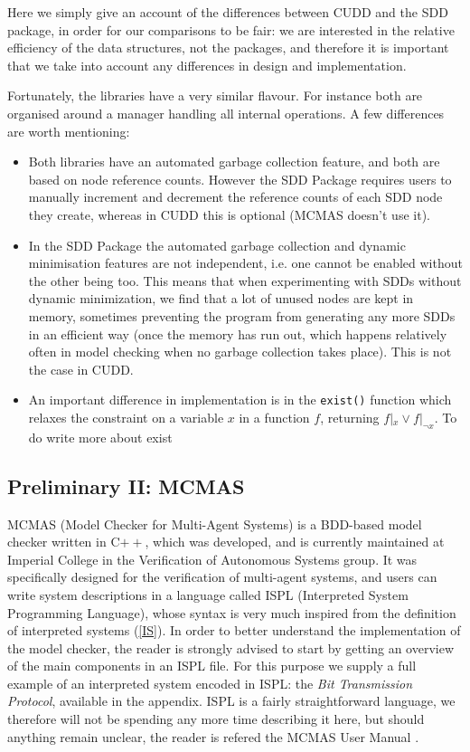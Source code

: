 \documentclass[11pt]{article}
\begin{document}
Here we simply give an account of the differences between  CUDD and the SDD package, in order for our comparisons to be fair: we are interested in the relative efficiency of the data structures, not the packages, and therefore it is important that we take into account any differences in design and implementation. 

Fortunately, the libraries have a very similar flavour. For instance both are organised around a manager handling all internal operations. A few differences are worth mentioning:
\begin{itemize}
\item Both libraries have an automated garbage collection feature, and both are based on node reference counts. However the SDD Package requires users to manually increment and decrement the reference counts of each SDD node they create, whereas in CUDD this is optional (MCMAS doesn't use it). 
\item In the SDD Package the automated garbage collection and dynamic minimisation features are not independent, i.e. one cannot be enabled without the other being too. This means that when experimenting with SDDs without dynamic minimization, we find that a lot of unused nodes are kept in memory, sometimes preventing the program from generating any more SDDs in an efficient way (once the memory has run out, which happens relatively often in model checking when no garbage collection takes place). This is not the case in CUDD. 
\item An important difference in implementation is in the \texttt{exist()} function which relaxes the constraint on a variable $x$ in a function $f$, returning $f|_x \lor f|_{\lnot x}$. 
To do write more about exist
\end{itemize}
\label{gc}

\subsection{Preliminary II: MCMAS} 


MCMAS (Model Checker for Multi-Agent Systems) is a BDD-based model checker written in C$++$, which was developed, and is currently maintained at Imperial College in the Verification of Autonomous Systems group. It was specifically designed for the verification of multi-agent systems, and users can write system descriptions in a language called ISPL (Interpreted System Programming Language), whose syntax is very much inspired from the definition of interpreted systems (\ref{IS}). In order to better understand the implementation of the model checker, the reader is strongly advised to start by getting an overview of the main components in an ISPL file. For this purpose we supply a full example of an interpreted system encoded in ISPL: the \textit{Bit Transmission Protocol}, available in the appendix. ISPL is a fairly straightforward language, we therefore will not be spending any more time describing it here, but should anything remain unclear, the reader is refered the MCMAS User Manual \cite{mcmas}.
\end{document}
